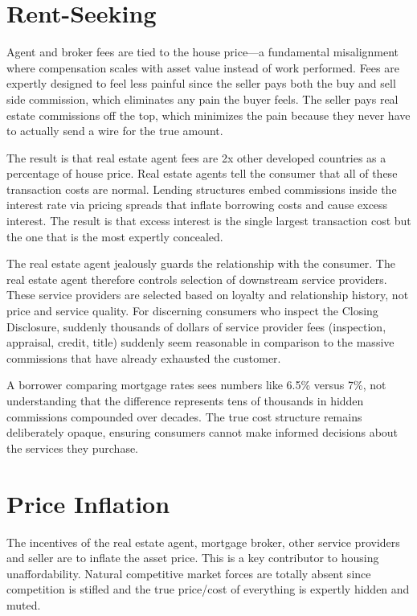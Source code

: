 \section{Rent-Seeking}

Agent and broker fees are tied to the house price---a fundamental misalignment where compensation scales with asset value instead of work performed. Fees are expertly designed to feel less painful since the seller pays both the buy and sell side commission, which eliminates any pain the buyer feels. The seller pays real estate commissions off the top, which minimizes the pain because they never have to actually send a wire for the true amount.

The result is that real estate agent fees are 2x other developed countries as a percentage of house price. Real estate agents tell the consumer that all of these transaction costs are normal. Lending structures embed commissions inside the interest rate via pricing spreads that inflate borrowing costs and cause excess interest. The result is that excess interest is the single largest transaction cost but the one that is the most expertly concealed.

The real estate agent jealously guards the relationship with the consumer. The real estate agent therefore controls selection of downstream service providers. These service providers are selected based on loyalty and relationship history, not price and service quality. For discerning consumers who inspect the Closing Disclosure, suddenly thousands of dollars of service provider fees (inspection, appraisal, credit, title) suddenly seem reasonable in comparison to the massive commissions that have already exhausted the customer.

A borrower comparing mortgage rates sees numbers like 6.5\% versus 7\%, not understanding that the difference represents tens of thousands in hidden commissions compounded over decades. The true cost structure remains deliberately opaque, ensuring consumers cannot make informed decisions about the services they purchase.

\section{Price Inflation}

The incentives of the real estate agent, mortgage broker, other service providers and seller are to inflate the asset price. This is a key contributor to housing unaffordability. Natural competitive market forces are totally absent since competition is stifled and the true price/cost of everything is expertly hidden and muted.

